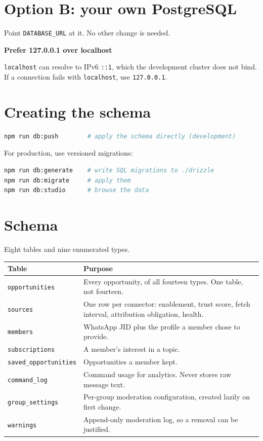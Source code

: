 \documentclass[11pt,a4paper]{report}
\newenvironment{callout}[1]
  {\begin{framed}\noindent\textbf{\textcolor{phcWarnInk}{#1}}\par\vspace{3pt}\small}
  {\end{framed}}
\begin{document}
\section{Option B: your own PostgreSQL}

Point \texttt{DATABASE\_URL} at it. No other change is needed.

\begin{callout}{Prefer 127.0.0.1 over localhost}
\texttt{localhost} can resolve to IPv6 \texttt{::1}, which the development
cluster does not bind. If a connection fails with \texttt{localhost}, use
\texttt{127.0.0.1}.
\end{callout}

\section{Creating the schema}

\begin{lstlisting}[language=bash]
npm run db:push        # apply the schema directly (development)
\end{lstlisting}

For production, use versioned migrations:

\begin{lstlisting}[language=bash]
npm run db:generate    # write SQL migrations to ./drizzle
npm run db:migrate     # apply them
npm run db:studio      # browse the data
\end{lstlisting}

\section{Schema}

Eight tables and nine enumerated types.

\begin{center}
\begin{tabularx}{\textwidth}{@{}lX@{}}
\toprule
\textbf{Table} & \textbf{Purpose} \\
\midrule
\texttt{opportunities} & Every opportunity, of all fourteen types. One table,
not fourteen. \\
\texttt{sources} & One row per connector: enablement, trust score, fetch
interval, attribution obligation, health. \\
\texttt{members} & WhatsApp JID plus the profile a member chose to provide. \\
\texttt{subscriptions} & A member's interest in a topic. \\
\texttt{saved\_opportunities} & Opportunities a member kept. \\
\texttt{command\_log} & Command usage for analytics. Never stores raw message
text. \\
\texttt{group\_settings} & Per-group moderation configuration, created lazily on
first change. \\
\texttt{warnings} & Append-only moderation log, so a removal can be justified. \\
\bottomrule
\end{tabularx}
\end{center}
\end{document}

